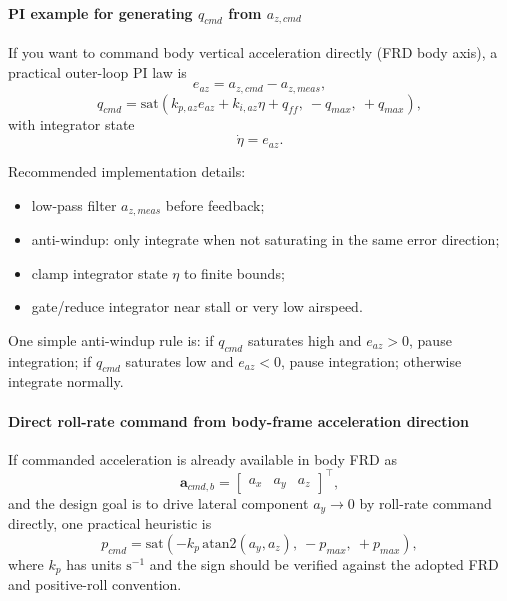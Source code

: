 \documentclass[11pt,a4paper]{article}
\begin{document}
\paragraph{PI example for generating $q_{cmd}$ from $a_{z,cmd}$}
If you want to command body vertical acceleration directly (FRD body axis), a practical outer-loop PI law is
\begin{equation}
e_{az} = a_{z,cmd} - a_{z,meas},
\end{equation}
\begin{equation}
q_{cmd} = \mathrm{sat}\!\left(k_{p,az}e_{az} + k_{i,az}\eta + q_{ff},\ -q_{max},\ +q_{max}\right),
\end{equation}
with integrator state
\begin{equation}
\dot{\eta} = e_{az}.
\end{equation}

Recommended implementation details:
\begin{itemize}
    \item low-pass filter $a_{z,meas}$ before feedback;
    \item anti-windup: only integrate when not saturating in the same error direction;
    \item clamp integrator state $\eta$ to finite bounds;
    \item gate/reduce integrator near stall or very low airspeed.
\end{itemize}

One simple anti-windup rule is: if $q_{cmd}$ saturates high and $e_{az}>0$, pause integration; if $q_{cmd}$ saturates low and $e_{az}<0$, pause integration; otherwise integrate normally.

\paragraph{Direct roll-rate command from body-frame acceleration direction}
If commanded acceleration is already available in body FRD as
\begin{equation}
\mathbf{a}_{cmd,b} = \begin{bmatrix} a_x & a_y & a_z \end{bmatrix}^\top,
\end{equation}
and the design goal is to drive lateral component $a_y \rightarrow 0$ by roll-rate command directly, one practical heuristic is
\begin{equation}
p_{cmd} = \mathrm{sat}\!\left(-k_p\,\mathrm{atan2}(a_y, a_z),\ -p_{max},\ +p_{max}\right),
\end{equation}
where $k_p$ has units $\mathrm{s}^{-1}$ and the sign should be verified against the adopted FRD and positive-roll convention.
\end{document}
